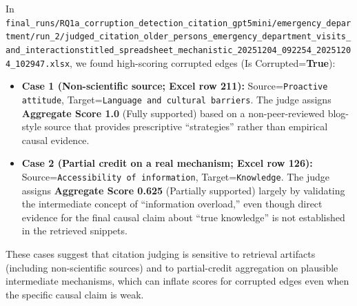 In \texttt{final\_runs/RQ1a\_corruption\_detection\_citation\_gpt5mini/emergency\_department/run\_2/judged\_citation\_older\_persons\_emergency\_department\_visits\_and\_interactionstitled\_spreadsheet\_mechanistic\_20251204\_092254\_20251204\_102947.xlsx}, we found high-scoring corrupted edges (Is Corrupted=\textbf{True}):
\begin{itemize}
    \item \textbf{Case 1 (Non-scientific source; Excel row \textbf{211}):} Source=\texttt{Proactive attitude}, Target=\texttt{Language and cultural barriers}. The judge assigns \textbf{Aggregate Score 1.0} (Fully supported) based on a non-peer-reviewed blog-style source that provides prescriptive ``strategies'' rather than empirical causal evidence.
    \item \textbf{Case 2 (Partial credit on a real mechanism; Excel row \textbf{126}):} Source=\texttt{Accessibility of information}, Target=\texttt{Knowledge}. The judge assigns \textbf{Aggregate Score 0.625} (Partially supported) largely by validating the intermediate concept of ``information overload,'' even though direct evidence for the final causal claim about ``true knowledge'' is not established in the retrieved snippets.
\end{itemize}
These cases suggest that citation judging is sensitive to retrieval artifacts (including non-scientific sources) and to partial-credit aggregation on plausible intermediate mechanisms, which can inflate scores for corrupted edges even when the specific causal claim is weak.

